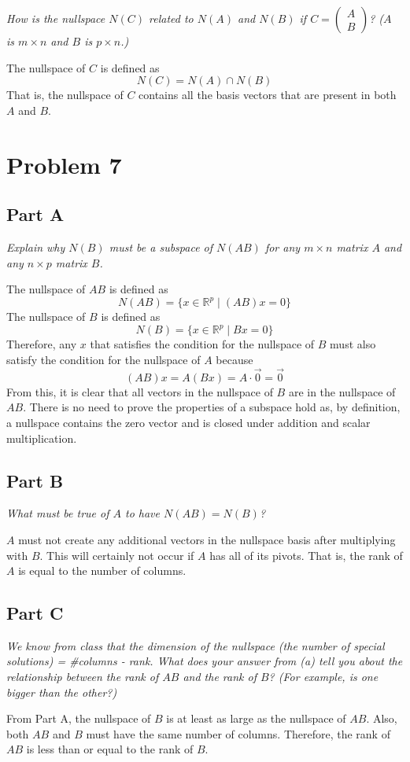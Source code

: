 \documentclass{article}
\begin{document}
\textit{How is the nullspace $N(C)$ related to $N(A)$ and $N(B)$ if $C =
\begin{pmatrix} A \\ B \end{pmatrix}$? ($A$ is $m \times n$ and $B$ is $p
\times n$.)}

\bigbreak

The nullspace of $ C $ is defined as
$$ N(C) = N(A) \cap N(B) $$
That is, the nullspace of $ C $ contains all the basis vectors that are
present in both $ A $ and $ B $.

\section*{Problem 7}

\subsection*{Part A}

\textit{Explain why $N(B)$ must be a subspace of $N(AB)$ for any $m \times n$
matrix $A$ and any $n \times p$ matrix $B$.}

\bigbreak

The nullspace of $ AB $ is defined as
$$ N(AB) = \{ x \in \mathbb{R}^p \mid (AB)x = 0 \} $$
The nullspace of $ B $ is defined as
$$ N(B) = \{ x \in \mathbb{R}^p \mid Bx = 0 \} $$
Therefore, any $ x $ that satisfies the condition for the nullspace of $ B $
must also satisfy the condition for the nullspace of $ A $ because
$$ (AB) x = A (B x) = A \cdot \vec{0} = \vec{0} $$
From this, it is clear that all vectors in the nullspace of $ B $ are in the
nullspace of $ AB $. There is no need to prove the properties of a subspace
hold as, by definition, a nullspace contains the zero vector and is closed
under addition and scalar multiplication.

\subsection*{Part B}

\textit{What must be true of $A$ to have $N(AB) = N(B)$?}

\bigbreak

$ A $ must not create any additional vectors in the nullspace basis after
multiplying with $ B $. This will certainly not occur if $ A $ has all of
its pivots. That is, the rank of $ A $ is equal to the number of columns.

\subsection*{Part C}

\textit{We know from class that the dimension of the nullspace (the number of
special solutions) = \#columns - rank. What does your answer from (a) tell you
about the relationship between the rank of $AB$ and the rank of $B$? (For
example, is one bigger than the other?)}

\bigbreak

From Part A, the nullspace of $ B $ is at least as large as the nullspace of
$ AB $. Also, both $ AB $ and $ B $ must have the same number of columns.
Therefore, the rank of $ AB $ is less than or equal to the rank of $ B $.
\end{document}
